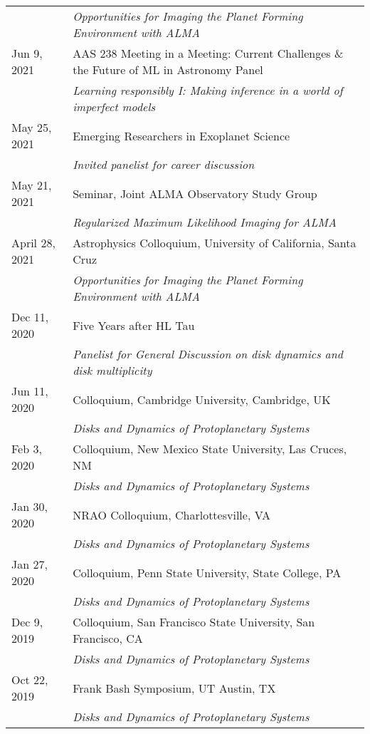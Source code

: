\begin{longtable}{@{\hspace{10pt}}p{1.2in}l}
  & \emph{Opportunities for Imaging the Planet Forming Environment with ALMA} \\[\rowskip]
  Jun 9, 2021 & AAS 238 Meeting in a Meeting: Current Challenges \& the Future of ML in Astronomy Panel\\
  & \emph{Learning responsibly I: Making inference in a world of imperfect models} \\[\rowskip]
  May 25, 2021 & Emerging Researchers in Exoplanet Science\\
  & \emph{Invited panelist for career discussion} \\[\rowskip]
  May 21, 2021 & Seminar, Joint ALMA Observatory Study Group\\
  & \emph{Regularized Maximum Likelihood Imaging for ALMA}\\[\rowskip]
  April 28, 2021 & Astrophysics Colloquium, University of California, Santa Cruz \\
  & \emph{Opportunities for Imaging the Planet Forming Environment with ALMA} \\[\rowskip]
  Dec 11, 2020 & Five Years after HL Tau \\ 
  & \emph{Panelist for General Discussion on disk dynamics and disk multiplicity} \\[\rowskip]
  Jun 11, 2020 & Colloquium, Cambridge University, Cambridge, UK \\ 
  & \emph{Disks and Dynamics of Protoplanetary Systems} \\[\rowskip]
  Feb 3, 2020 & Colloquium, New Mexico State University, Las Cruces, NM \\
  & \emph{Disks and Dynamics of Protoplanetary Systems} \\[\rowskip]
  Jan 30, 2020 & NRAO Colloquium, Charlottesville, VA \\
  & \emph{Disks and Dynamics of Protoplanetary Systems} \\[\rowskip]
  Jan 27, 2020 & Colloquium, Penn State University, State College, PA \\
  & \emph{Disks and Dynamics of Protoplanetary Systems} \\[\rowskip]
  Dec 9, 2019 & Colloquium, San Francisco State University, San Francisco, CA \\
  & \emph{Disks and Dynamics of Protoplanetary Systems} \\[\rowskip]
  Oct 22, 2019 & Frank Bash Symposium, UT Austin, TX \\
  & \emph{Disks and Dynamics of Protoplanetary Systems} \\[\rowskip]

\end{longtable}
